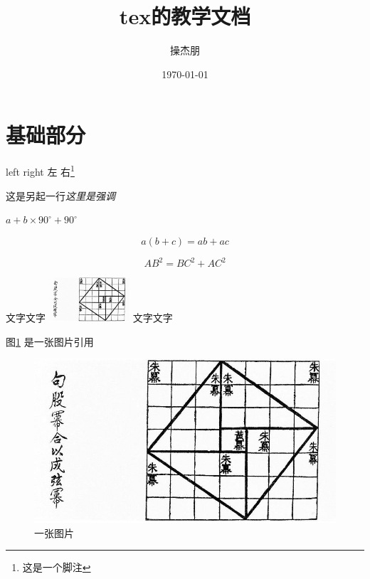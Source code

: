 \documentclass[UTF8]{ctexart}
\title{\heiti tex的教学文档}
\author{\kaishu 操杰朋}
\date{\today}
\newcommand\degree{^\circ}
\begin{document}
\maketitle

\tableofcontents

\section{基础部分}

left right 左 右\footnote{这是一个脚注}

这是另起一行\emph{这里是强调}

$a + b \times 90^\circ + 90\degree$

\begin{equation}
  a(b + c) = ab + ac
\end{equation}

\begin{equation}\label{eq:gougu}
  AB^2 = BC^2 + AC^2
\end{equation}

文字文字
\includegraphics[width=3cm]{1.jpg}
文字文字

图\ref{flag:xiantu} 是一张图片引用

\begin{figure}[ht]
  \centering
  \includegraphics[scale=0.5]{1.jpg}
  \caption{一张图片}
  \label{flag:xiantu}
\end{figure}
\end{document}
